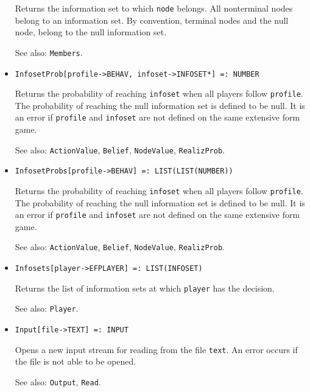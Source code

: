 \begin{itemize}
\bd
Returns the information set to which \verb+node+ belongs.  All
nonterminal nodes belong to an information set.  By convention,
terminal nodes and the null node, belong to the null information set.
\item [See also:] \verb+Members+.
\ed

\item{}
\protect \large \begin{verbatim}
InfosetProb[profile->BEHAV, infoset->INFOSET*] =: NUMBER 
\end{verbatim}\normalsize

\bd
Returns the probability of reaching \verb+infoset+ when all players
follow \verb+profile+.  The probability of reaching the null information
set is defined to be null.  It is an error if \verb+profile+ and
\verb+infoset+ are not defined on the same extensive form game.
\item
[See also:] \verb+ActionValue+, \verb+Belief+, \verb+NodeValue+,
\verb+RealizProb+.
\ed

\item{}
\protect \large \begin{verbatim}
InfosetProbs[profile->BEHAV] =: LIST(LIST(NUMBER)) 
\end{verbatim}\normalsize

\bd
Returns the probability of reaching \verb+infoset+ when all players
follow \verb+profile+.  The probability of reaching the null information
set is defined to be null.  It is an error if \verb+profile+ and
\verb+infoset+ are not defined on the same extensive form game.
\item
[See also:] \verb+ActionValue+, \verb+Belief+, \verb+NodeValue+,
\verb+RealizProb+.
\ed

\item{}
\protect \large \begin{verbatim}
Infosets[player->EFPLAYER] =: LIST(INFOSET) 
\end{verbatim}\normalsize

\bd
Returns the list of information sets at which 
\verb+player+ has the decision.
\item [See also:] \verb+Player+.
\ed

\item{}
\protect \large \begin{verbatim}
Input[file->TEXT] =: INPUT 
\end{verbatim}\normalsize

\bd
Opens a new input stream for reading from the file \verb+text+.  An
error occurs if the file is not able to be opened.
\item
[See also:]  \verb+Output+, \verb+Read+.
\ed


\end{itemize}
